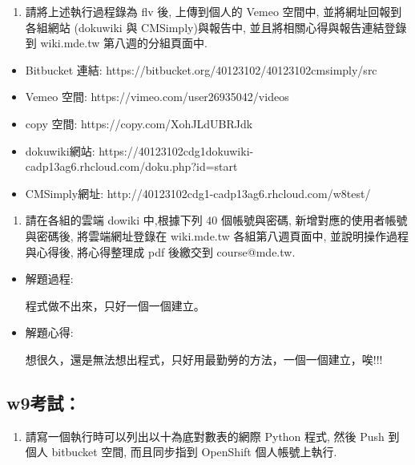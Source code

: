 \documentclass[]{article}
\begin{document}
\begin{enumerate}
\def\labelenumi{\arabic{enumi}.}
\setcounter{enumi}{1}
\itemsep1pt\parskip0pt
\item
  請將上述執行過程錄為 flv 後, 上傳到個人的 Vemeo 空間中,
  並將網址回報到各組網站 (dokuwiki 與 CMSimply)與報告中,
  並且將相關心得與報告連結登錄到 wiki.mde.tw 第八週的分組頁面中.
\end{enumerate}

\begin{itemize}
\item
  Bitbucket 連結: https://bitbucket.org/40123102/40123102cmsimply/src
\item
  Vemeo 空間: https://vimeo.com/user26935042/videos
\item
  copy 空間: https://copy.com/XohJLdUBRJdk
\item
  dokuwiki網站:
  https://40123102cdg1dokuwiki-cadp13ag6.rhcloud.com/doku.php?id=start
\item
  CMSimply網址: http://40123102cdg1-cadp13ag6.rhcloud.com/w8test/
\end{itemize}

\begin{enumerate}
\def\labelenumi{\arabic{enumi}.}
\setcounter{enumi}{2}
\itemsep1pt\parskip0pt
\item
  請在各組的雲端 dowiki 中,根據下列 40 個帳號與密碼,
  新增對應的使用者帳號與密碼後, 將雲端網址登錄在 wiki.mde.tw
  各組第八週頁面中, 並說明操作過程與心得後, 將心得整理成 pdf 後繳交到
  course@mde.tw.
\end{enumerate}

\begin{itemize}
\item
  解題過程:

  程式做不出來，只好一個一個建立。
\item
  解題心得:

  想很久，還是無法想出程式，只好用最勤勞的方法，一個一個建立，唉!!!
\end{itemize}

\subsection{w9考試：}\label{w9ux8003ux8a66}

\begin{enumerate}
\def\labelenumi{\arabic{enumi}.}
\itemsep1pt\parskip0pt
\item
  請寫一個執行時可以列出以十為底對數表的網際 Python 程式, 然後 Push
  到個人 bitbucket 空間, 而且同步指到 OpenShift 個人帳號上執行.
\end{enumerate}
\end{document}
